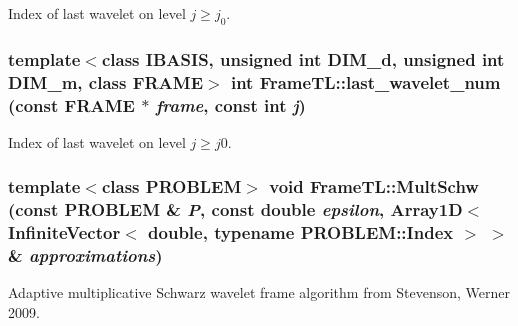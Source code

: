Index of last wavelet on level $j \geq j_0$. \hypertarget{namespaceFrameTL_98345f161b05ac9604fbd9070da0bba7}{
\subsubsection[last\_\-wavelet\_\-num]{\setlength{\rightskip}{0pt plus 5cm}template$<$class IBASIS, unsigned int DIM\_\-d, unsigned int DIM\_\-m, class FRAME$>$ int FrameTL::last\_\-wavelet\_\-num (const FRAME $\ast$ {\em frame}, \/  const int {\em j})}}
\label{namespaceFrameTL_98345f161b05ac9604fbd9070da0bba7}


Index of last wavelet on level $j \geq j0$. \hypertarget{namespaceFrameTL_a6fc7f7f5f218c3dc3e34081b4e7464d}{
\subsubsection[MultSchw]{\setlength{\rightskip}{0pt plus 5cm}template$<$class PROBLEM$>$ void FrameTL::MultSchw (const PROBLEM \& {\em P}, \/  const double {\em epsilon}, \/  Array1D$<$ InfiniteVector$<$ double, typename PROBLEM::Index $>$ $>$ \& {\em approximations})}}
\label{namespaceFrameTL_a6fc7f7f5f218c3dc3e34081b4e7464d}


Adaptive multiplicative Schwarz wavelet frame algorithm from Stevenson, Werner 2009. 

